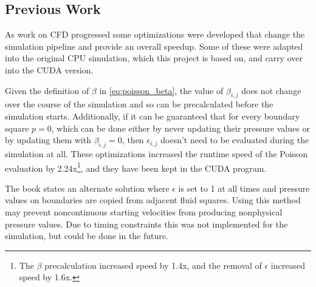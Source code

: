 \subsection{Previous Work}
\label{research:prev_work}
As work on CFD progressed some optimizations were developed that change the simulation pipeline and provide an overall speedup.
Some of these were adapted into the original CPU simulation\cite{modules:aca257submission}, which this project is based on, and carry over into the CUDA version.


Given the definition of $\beta$ in \cref{eq:poisson_beta}, the value of $\beta_{i,j}$ does not change over the course of the simulation and so can be precalculated before the simulation starts.
Additionally, if it can be guaranteed that for every boundary square $p = 0$, which can be done either by never updating their pressure values or by updating them with $\beta_{i,j} = 0$, then $\epsilon_{i,j}$ doesn't need to be evaluated during the simulation at all.
These optimizations increased the runtime speed of the Poisson evaluation by 2.24x\footnote{The $\beta$ precalculation increased speed by 1.4x, and the removal of $\epsilon$ increased speed by 1.6x.\cite{modules:aca257submission}}, and they have been kept in the CUDA program.

The book states an alternate solution where $\epsilon$ is set to 1 at all times and pressure values on boundaries are copied from adjacent fluid squares\cite{book:griebel1998numerical}.
Using this method may prevent noncontinuous starting velocities from producing nonphysical pressure values.
Due to timing constraints this was not implemented for the simulation, but could be done in the future.
\label{ext:PressureValues}



